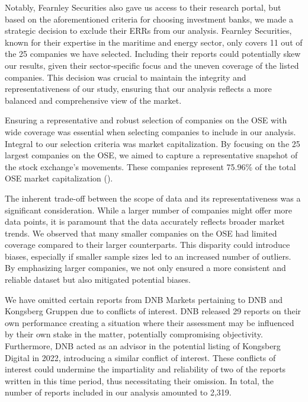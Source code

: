 Notably, Fearnley Securities also gave us access to their research portal, but based on the aforementioned criteria for choosing investment banks, we made a strategic decision to exclude their ERRs from our analysis. Fearnley Securities, known for their expertise in the maritime and energy sector, only covers 11 out of the 25 companies we have selected. Including their reports could potentially skew our results, given their sector-specific focus and the uneven coverage of the listed companies. This decision was crucial to maintain the integrity and representativeness of our study, ensuring that our analysis reflects a more balanced and comprehensive view of the market.

Ensuring a representative and robust selection of companies on the OSE with wide coverage was essential when selecting companies to include in our analysis. Integral to our selection criteria was market capitalization. By focusing on the 25 largest companies on the OSE, we aimed to capture a representative snapshot of the stock exchange's movements. These companies represent 75.96\% of the total OSE market capitalization (\cite{euronext2023}). 

The inherent trade-off between the scope of data and its representativeness was a significant consideration. While a larger number of companies might offer more data points, it is paramount that the data accurately reflects broader market trends. We observed that many smaller companies on the OSE had limited coverage compared to their larger counterparts. This disparity could introduce biases, especially if smaller sample sizes led to an increased number of outliers. By emphasizing larger companies, we not only ensured a more consistent and reliable dataset but also mitigated potential biases. 

We have omitted certain reports from DNB Markets pertaining to DNB and Kongsberg Gruppen due to conflicts of interest. DNB released 29 reports on their own performance creating a situation where their assessment may be influenced by their own stake in the matter, potentially compromising objectivity. Furthermore, DNB acted as an advisor in the potential listing of Kongsberg Digital in 2022, introducing a similar conflict of interest. These conflicts of interest could undermine the impartiality and reliability of two of the reports written in this time period, thus necessitating their omission. In total, the number of reports included in our analysis amounted to 2,319.

